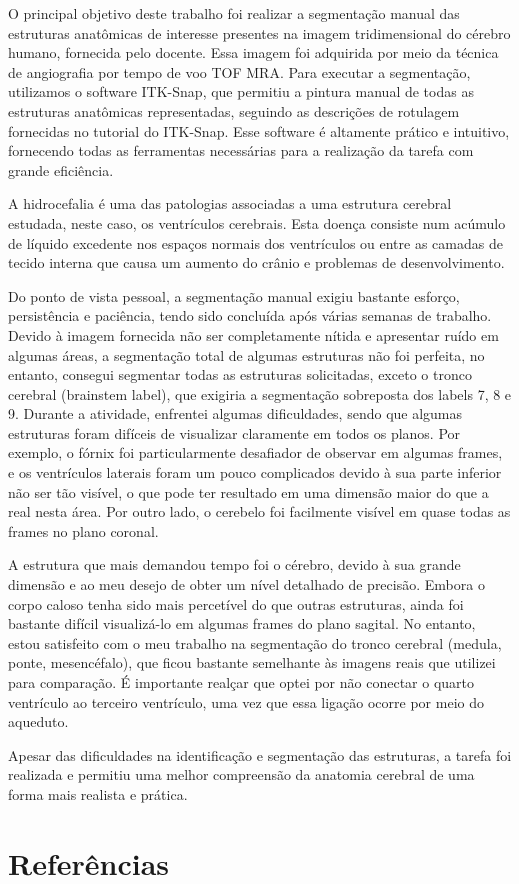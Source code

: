 \documentclass[11pt,a4paper,oneside]{article}
\begin{document}
{
	O principal objetivo deste trabalho foi realizar a segmentação manual das estruturas anatômicas de interesse presentes na imagem tridimensional do cérebro humano, fornecida pelo docente. Essa imagem foi adquirida por meio da técnica de angiografia por tempo de voo TOF MRA. Para executar a segmentação, utilizamos o software ITK-Snap, que permitiu a pintura manual de todas as estruturas anatômicas representadas, seguindo as descrições de rotulagem fornecidas no tutorial do ITK-Snap. Esse software é altamente prático e intuitivo, fornecendo todas as ferramentas necessárias para a realização da tarefa com grande eficiência.\cite{py06nimg}
	
	A hidrocefalia é uma das patologias associadas a uma estrutura cerebral estudada, neste caso, os ventrículos cerebrais. Esta doença consiste num acúmulo de líquido excedente nos espaços normais dos ventrículos ou entre as camadas de tecido interna que causa um aumento do crânio e problemas de desenvolvimento. \cite{cruz2022tumor}
	
	Do ponto de vista pessoal, a segmentação manual exigiu bastante esforço, persistência e paciência, tendo sido concluída após várias semanas de trabalho. Devido à imagem fornecida não ser completamente nítida e apresentar ruído em algumas áreas, a segmentação total de algumas estruturas não foi perfeita, no entanto, consegui segmentar todas as estruturas solicitadas, exceto o tronco cerebral (brainstem label), que exigiria a segmentação sobreposta dos labels 7, 8 e 9. Durante a atividade, enfrentei algumas dificuldades, sendo que algumas estruturas foram difíceis de visualizar claramente em todos os planos. Por exemplo, o fórnix foi particularmente desafiador de observar em algumas frames, e os ventrículos laterais foram um pouco complicados devido à sua parte inferior não ser tão visível, o que pode ter resultado em uma dimensão maior do que a real nesta área. Por outro lado, o cerebelo foi facilmente visível em quase todas as frames no plano coronal.
	
	A estrutura que mais demandou tempo foi o cérebro, devido à sua grande dimensão e ao meu desejo de obter um nível detalhado de precisão. Embora o corpo caloso tenha sido mais percetível do que outras estruturas, ainda foi bastante difícil visualizá-lo em algumas frames do plano sagital. No entanto, estou satisfeito com o meu trabalho na segmentação do tronco cerebral (medula, ponte, mesencéfalo), que ficou bastante semelhante às imagens reais que utilizei para comparação. É importante realçar que optei por não conectar o quarto ventrículo ao terceiro ventrículo, uma vez que essa ligação ocorre por meio do aqueduto.\cite{yushkevich2006user}
	
	Apesar das dificuldades na identificação e segmentação das estruturas, a tarefa foi realizada e permitiu uma melhor compreensão da anatomia cerebral de uma forma mais realista e prática. 
 }


\vfill
\section*{Referências}





\vfill
\end{document}
